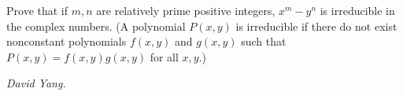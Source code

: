 Prove that if $m,n$ are relatively prime positive integers, $x^m-y^n$ is irreducible in the complex numbers. (A polynomial $P(x,y)$ is irreducible if there do not exist nonconstant polynomials $f(x,y)$ and $g(x,y)$ such that $P(x,y) = f(x,y)g(x,y)$ for all $x,y$.)

\textit{David Yang.}